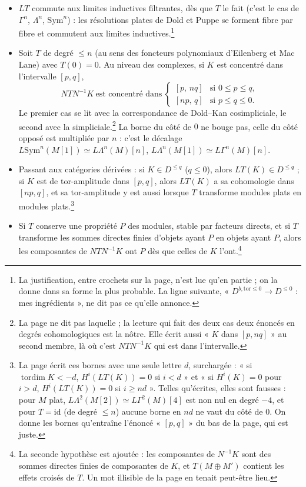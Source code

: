 \documentclass[11pt,a4paper]{article}
\begin{document}
\begin{itemize}
\item $LT$ commute aux limites inductives filtrantes, dès que $T$ le
fait (c'est le cas de $\Gamma^n$, $\Lambda^n$, $\mathrm{Sym}^n$) : les
résolutions plates de Dold et Puppe se forment fibre par fibre et commutent
aux limites inductives.\footnote{La justification, entre crochets sur la page,
n'est lue qu'en partie ; on la donne dans sa forme la plus probable. La ligne
suivante, « $D^{b,\mathrm{tor}\leqslant 0} \to D^{\leqslant 0}$ : mes
ingrédients », ne dit pas ce qu'elle annonce.}

\item Soit $T$ de degré $\leqslant n$ (au sens des foncteurs polynomiaux
d'Eilenberg et Mac Lane) avec $T(0) = 0$. Au niveau des complexes, si $K$ est
concentré dans l'intervalle $[p, q]$,
\[
N T N^{-1} K \ \text{est concentré dans}\
\begin{cases}
[p,\, nq] & \text{si } 0 \leqslant p \leqslant q,\\
[np,\, q] & \text{si } p \leqslant q \leqslant 0.
\end{cases}
\]
Le premier cas se lit avec la correspondance de Dold--Kan cosimpliciale, le
second avec la simpliciale.\footnote{La page ne dit pas laquelle ; la lecture
qui fait des deux cas deux énoncés en degrés cohomologiques est la nôtre. Elle
écrit aussi « $K$ dans $[p, nq]$ » au second membre, là où c'est $NTN^{-1}K$
qui est dans l'intervalle.} La borne du côté de $0$ ne bouge pas, celle du
côté opposé est multipliée par $n$ : c'est le décalage
$L\mathrm{Sym}^n(M[1]) \simeq L\Lambda^n(M)[n]$,
$L\Lambda^n(M[1]) \simeq L\Gamma^n(M)[n]$.

\item Passant aux catégories dérivées : si $K \in D^{\leqslant q}$
($q \leqslant 0$), alors $LT(K) \in D^{\leqslant q}$ ; si $K$ est de
tor-amplitude dans $[p, q]$, alors $LT(K)$ a sa cohomologie dans $[np, q]$,
et sa tor-amplitude y est aussi lorsque $T$ transforme modules plats en
modules plats.\footnote{La page écrit ces bornes avec une seule lettre $d$,
surchargée : « si $\operatorname{tordim} K < -d$, $H^i(LT(K)) = 0$ si $i<d$ »
et « si $H^i(K) = 0$ pour $i > d$, $H^i(LT(K)) = 0$ si $i \geqslant nd$ ».
Telles qu'écrites, elles sont fausses : pour $M$ plat,
$L\Lambda^2(M[2]) \simeq L\Gamma^2(M)[4]$ est non nul en degré $-4$, et pour
$T = \mathrm{id}$ (de degré $\leqslant n$) aucune borne en $nd$ ne vaut du
côté de $0$. On donne les bornes qu'entraîne l'énoncé « $[p,q]$ » du bas de la
page, qui est juste.}

\item Si $T$ conserve une propriété $P$ des modules, stable par facteurs
directs, et si $T$ transforme les sommes directes finies d'objets ayant $P$ en
objets ayant $P$, alors les composantes de $NTN^{-1}K$ ont $P$ dès que celles
de $K$ l'ont.\footnote{La seconde hypothèse est ajoutée : les composantes de
$N^{-1}K$ sont des sommes directes finies de composantes de $K$, et
$T(M \oplus M')$ contient les effets croisés de $T$. Un mot illisible de la
page en tenait peut-être lieu.}
\end{itemize}
\end{document}
